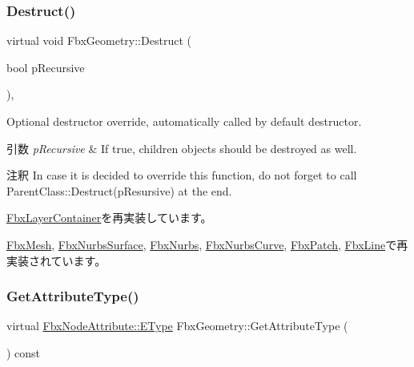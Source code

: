 \mbox{\label{class_fbx_geometry_a07e94f7801067d66429afbf1799795cd}} 
\subsubsection{\texorpdfstring{Destruct()}{Destruct()}}
{\footnotesize\ttfamily virtual void Fbx\+Geometry\+::\+Destruct (\begin{DoxyParamCaption}\item[{bool}]{p\+Recursive }\end{DoxyParamCaption})\hspace{0.3cm}{\ttfamily [protected]}, {\ttfamily [virtual]}}

Optional destructor override, automatically called by default destructor. 
\begin{DoxyParams}{引数}
{\em p\+Recursive} & If true, children objects should be destroyed as well. \\
\hline
\end{DoxyParams}
\begin{DoxyRemark}{注釈}
In case it is decided to override this function, do not forget to call Parent\+Class\+::\+Destruct(p\+Resursive) at the end. 
\end{DoxyRemark}


\hyperlink{class_fbx_layer_container_aefb90aadf569c7ebbbd3672e9c45776f}{Fbx\+Layer\+Container}を再実装しています。



\hyperlink{class_fbx_mesh_a1755e89d515fadbc2d52924917b618f7}{Fbx\+Mesh}, \hyperlink{class_fbx_nurbs_surface_ab9ff252170ad2dc35958af782962a5c9}{Fbx\+Nurbs\+Surface}, \hyperlink{class_fbx_nurbs_a8a5ea388bc948e47ab65e1705f98f402}{Fbx\+Nurbs}, \hyperlink{class_fbx_nurbs_curve_a8c562cccf434c37cb3aad0df27d60e86}{Fbx\+Nurbs\+Curve}, \hyperlink{class_fbx_patch_a7e094310626891214577dabe4ff145f9}{Fbx\+Patch}, \hyperlink{class_fbx_line_a92abd64f6b58057c899bf5733a2e2275}{Fbx\+Line}で再実装されています。

\mbox{\label{class_fbx_geometry_a41ae23e5d0cf08693bca49737f333de9}} 
\subsubsection{\texorpdfstring{Get\+Attribute\+Type()}{GetAttributeType()}}
{\footnotesize\ttfamily virtual \hyperlink{class_fbx_node_attribute_a08e1669d3d1a696910756ab17de56d6a}{Fbx\+Node\+Attribute\+::\+E\+Type} Fbx\+Geometry\+::\+Get\+Attribute\+Type (\begin{DoxyParamCaption}{ }\end{DoxyParamCaption}) const\hspace{0.3cm}{\ttfamily [virtual]}}

